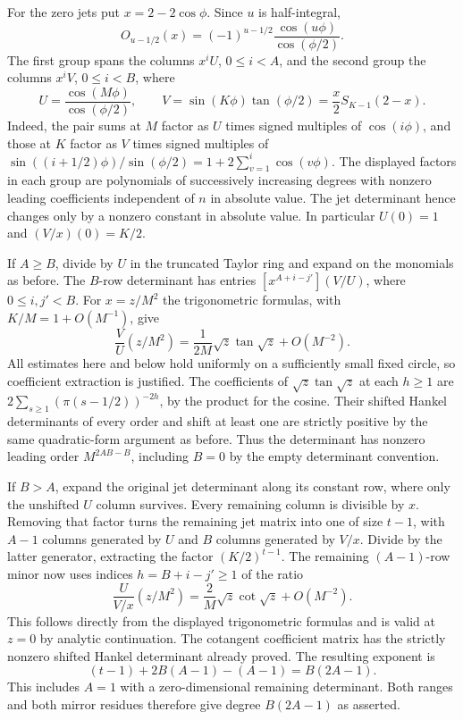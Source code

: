 \documentclass[11pt,a4paper]{article}
\theoremstyle{definition}\newtheorem{problem}[theorem]{Auxiliary problem}
\theoremstyle{remark}\newtheorem*{remark}{Remark}
\begin{document}
For the zero jets put $x=2-2\cos\phi$. Since $u$ is half-integral,
\[
 O_{u-1/2}(x)=(-1)^{u-1/2}\frac{\cos(u\phi)}{\cos(\phi/2)}.
\]
The first group spans the columns $x^i U$, $0\le i<A$, and the second group the columns $x^i V$, $0\le i<B$, where
\[
 U=\frac{\cos(M\phi)}{\cos(\phi/2)},\qquad
 V=\sin(K\phi)\tan(\phi/2)=\frac{x}{2}S_{K-1}(2-x).
\]
Indeed, the pair sums at $M$ factor as $U$ times signed multiples of $\cos(i\phi)$, and those at $K$ factor as $V$ times signed multiples of
$\sin((i+1/2)\phi)/\sin(\phi/2)=1+2\sum_{v=1}^i\cos(v\phi)$. The displayed factors in each group are polynomials of successively increasing degrees with nonzero leading coefficients independent of $n$ in absolute value. The jet determinant hence changes only by a nonzero constant in absolute value. In particular $U(0)=1$ and $(V/x)(0)=K/2$.

If $A\ge B$, divide by $U$ in the truncated Taylor ring and expand on the monomials as before. The $B$-row determinant has entries $[x^{A+i-j'}](V/U)$, where $0\le i,j'<B$. For $x=z/M^2$ the trigonometric formulas, with $K/M=1+O(M^{-1})$, give
\[
 \frac{V}{U}(z/M^2)=\frac{1}{2M}\sqrt z\tan\sqrt z+O(M^{-2}).
\]
All estimates here and below hold uniformly on a sufficiently small fixed circle, so coefficient extraction is justified. The coefficients of $\sqrt z\tan\sqrt z$ at each $h\ge1$ are $2\sum_{s\ge1}(\pi(s-1/2))^{-2h}$, by the product for the cosine. Their shifted Hankel determinants of every order and shift at least one are strictly positive by the same quadratic-form argument as before. Thus the determinant has nonzero leading order $M^{2AB-B}$, including $B=0$ by the empty determinant convention.

If $B>A$, expand the original jet determinant along its constant row, where only the unshifted $U$ column survives. Every remaining column is divisible by $x$. Removing that factor turns the remaining jet matrix into one of size $t-1$, with $A-1$ columns generated by $U$ and $B$ columns generated by $V/x$. Divide by the latter generator, extracting the factor $(K/2)^{t-1}$. The remaining $(A-1)$-row minor now uses indices $h=B+i-j'\ge1$ of the ratio
\[
 \frac{U}{V/x}(z/M^2)
 =\frac{2}{M}\sqrt z\cot\sqrt z+O(M^{-2}).
\]
This follows directly from the displayed trigonometric formulas and is valid at $z=0$ by analytic continuation. The cotangent coefficient matrix has the strictly nonzero shifted Hankel determinant already proved. The resulting exponent is
\[
 (t-1)+2B(A-1)-(A-1)=B(2A-1).
\]
This includes $A=1$ with a zero-dimensional remaining determinant. Both ranges and both mirror residues therefore give degree $B(2A-1)$ as asserted.
\end{document}

